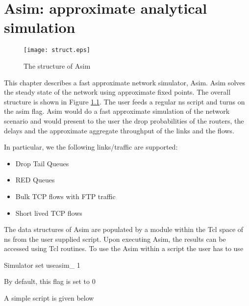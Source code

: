 \chapter{Asim: approximate analytical simulation}
\label{chap:asim}

\begin{figure}
\vspace{1em}
\centerline{\texttt{[image: struct.eps]}}
\vspace{1em}
\caption{The structure of Asim}
\label{fig:struct}
\end{figure}


This chapter describes a fast approximate network simulator, Asim. 
Asim solves the steady state of the network using 
approximate fixed points. The overall structure is shown in 
Figure \ref{fig:struct}.
The user feeds a regular ns script 
and turns on the asim flag.
Asim would do a fast approximate simulation of the 
network scenario and would present to the user the drop probabilities
of the routers, 
the delays and the approximate aggregate throughput 
of the links and the flows.

In particular, we the following links/traffic are supported:
\begin{itemize}
\item Drop Tail Queues
\item RED Queues
\item Bulk TCP flows with FTP traffic
\item Short lived TCP flows 
\end{itemize} 

The data structures of Asim 
are populated by a module within the Tcl space of ns from the 
user supplied script. Upon executing Asim, the results can 
be accessed using Tcl routines. 
To use the Asim within a script the user has to use 

\noindent Simulator set useasim\_ 1

\noindent By default, this flag is set to 0

A simple script is given below

